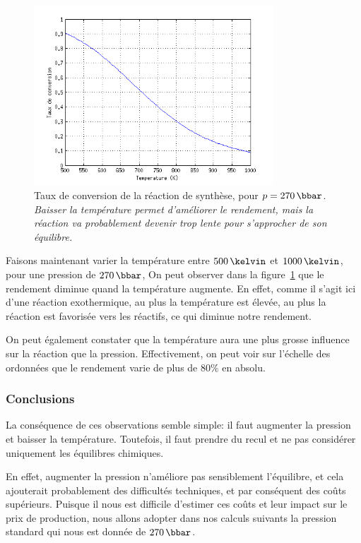 \begin{figure}
    \centering
    \includegraphics[width=0.8\textwidth]{img/param-temp}
    \caption{
        Taux de conversion de la réaction de synthèse,
        pour $p=270\,\bbar$.
        \emph{Baisser la température permet d'améliorer le rendement,
        mais la réaction va probablement devenir trop lente pour s'approcher
        de son équilibre.}
    }
    \label{fig:param-temp}
\end{figure}

Faisons maintenant varier la température entre $500\,\kelvin$ et $1000\,\kelvin$, pour une pression de $270\,\bbar$,
On peut observer dans la figure~\ref{fig:param-temp} que le rendement diminue quand la température augmente. En effet, comme il s'agit ici d'une réaction exothermique, au plus la température est élevée, au plus la réaction est favorisée vers les réactifs, ce qui diminue notre rendement.

On peut également constater que la température aura une plus grosse influence sur la réaction que la pression. Effectivement, on peut voir sur l'échelle des ordonnées que le rendement varie de plus de $80\%$ en absolu.

\subsubsection{Conclusions}

La conséquence de ces observations semble simple:
il faut augmenter la pression et baisser la température.
Toutefois, il faut prendre du recul et ne pas considérer uniquement
les équilibres chimiques.

En effet, augmenter la pression n'améliore pas sensiblement l'équilibre,
et cela ajouterait probablement des difficultés techniques, et par conséquent
des coûts supérieurs. Puisque il nous est difficile d'estimer ces coûts et leur
impact sur le prix de production, nous allons adopter dans nos calculs suivants
la pression standard qui nous est donnée de $270\,\bbar$.

